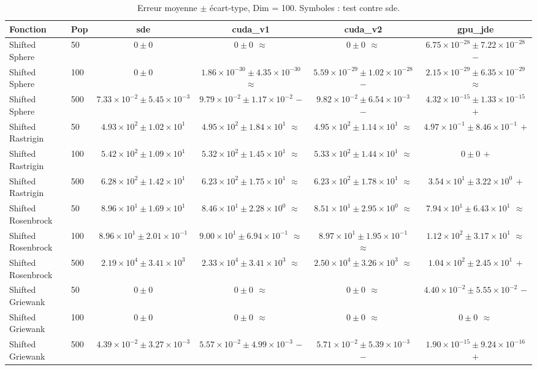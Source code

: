 \begin{table}[t]
\centering
\caption{Erreur moyenne $\pm$ écart-type, Dim = 100. Symboles : test contre sde.}
\label{tab:quality_d100}
\scriptsize
\begin{tabular}{llcccc}
\toprule
Fonction & Pop & sde & cuda\_v1 & cuda\_v2 & gpu\_jde \\
\midrule
Shifted Sphere & 50 & \textbf{$0\pm0$} & \textbf{$0\pm0$ $\approx$} & \textbf{$0\pm0$ $\approx$} & $6.75\times10^{-28}\pm7.22\times10^{-28}$ $-$ \\
Shifted Sphere & 100 & \textbf{$0\pm0$} & $1.86\times10^{-30}\pm4.35\times10^{-30}$ $\approx$ & $5.59\times10^{-29}\pm1.02\times10^{-28}$ $-$ & $2.15\times10^{-29}\pm6.35\times10^{-29}$ $\approx$ \\
Shifted Sphere & 500 & $7.33\times10^{-2}\pm5.45\times10^{-3}$ & $9.79\times10^{-2}\pm1.17\times10^{-2}$ $-$ & $9.82\times10^{-2}\pm6.54\times10^{-3}$ $-$ & \textbf{$4.32\times10^{-15}\pm1.33\times10^{-15}$ $+$} \\
Shifted Rastrigin & 50 & $4.93\times10^{2}\pm1.02\times10^{1}$ & $4.95\times10^{2}\pm1.84\times10^{1}$ $\approx$ & $4.95\times10^{2}\pm1.14\times10^{1}$ $\approx$ & \textbf{$4.97\times10^{-1}\pm8.46\times10^{-1}$ $+$} \\
Shifted Rastrigin & 100 & $5.42\times10^{2}\pm1.09\times10^{1}$ & $5.32\times10^{2}\pm1.45\times10^{1}$ $\approx$ & $5.33\times10^{2}\pm1.44\times10^{1}$ $\approx$ & \textbf{$0\pm0$ $+$} \\
Shifted Rastrigin & 500 & $6.28\times10^{2}\pm1.42\times10^{1}$ & $6.23\times10^{2}\pm1.75\times10^{1}$ $\approx$ & $6.23\times10^{2}\pm1.78\times10^{1}$ $\approx$ & \textbf{$3.54\times10^{1}\pm3.22\times10^{0}$ $+$} \\
Shifted Rosenbrock & 50 & $8.96\times10^{1}\pm1.69\times10^{1}$ & $8.46\times10^{1}\pm2.28\times10^{0}$ $\approx$ & $8.51\times10^{1}\pm2.95\times10^{0}$ $\approx$ & \textbf{$7.94\times10^{1}\pm6.43\times10^{1}$ $\approx$} \\
Shifted Rosenbrock & 100 & \textbf{$8.96\times10^{1}\pm2.01\times10^{-1}$} & $9.00\times10^{1}\pm6.94\times10^{-1}$ $\approx$ & $8.97\times10^{1}\pm1.95\times10^{-1}$ $\approx$ & $1.12\times10^{2}\pm3.17\times10^{1}$ $\approx$ \\
Shifted Rosenbrock & 500 & $2.19\times10^{4}\pm3.41\times10^{3}$ & $2.33\times10^{4}\pm3.41\times10^{3}$ $\approx$ & $2.50\times10^{4}\pm3.26\times10^{3}$ $\approx$ & \textbf{$1.04\times10^{2}\pm2.45\times10^{1}$ $+$} \\
Shifted Griewank & 50 & \textbf{$0\pm0$} & \textbf{$0\pm0$ $\approx$} & \textbf{$0\pm0$ $\approx$} & $4.40\times10^{-2}\pm5.55\times10^{-2}$ $-$ \\
Shifted Griewank & 100 & \textbf{$0\pm0$} & \textbf{$0\pm0$ $\approx$} & \textbf{$0\pm0$ $\approx$} & \textbf{$0\pm0$ $\approx$} \\
Shifted Griewank & 500 & $4.39\times10^{-2}\pm3.27\times10^{-3}$ & $5.57\times10^{-2}\pm4.99\times10^{-3}$ $-$ & $5.71\times10^{-2}\pm5.39\times10^{-3}$ $-$ & \textbf{$1.90\times10^{-15}\pm9.24\times10^{-16}$ $+$} \\
\bottomrule
\end{tabular}
\end{table}
